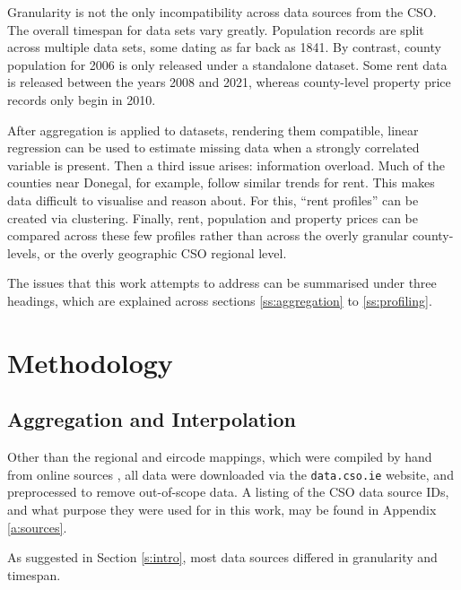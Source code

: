 \documentclass[twocolumn]{article}
\begin{document}
Granularity is not the only incompatibility across data sources from the CSO.
The overall timespan for data sets vary greatly.  Population records are split
across multiple data sets, some dating as far back as 1841.  By contrast,
county population for 2006 is only released under a standalone dataset.  Some
rent data is released between the years 2008 and 2021, whereas county-level
property price records only begin in 2010.

After aggregation is applied to datasets, rendering them compatible, linear
regression can be used to estimate missing data when a strongly correlated
variable is present.  Then a third issue arises: information overload.  Much of
the counties near Donegal, for example, follow similar trends for rent.  This
makes data difficult to visualise and reason about.  For this, ``rent
profiles'' can be created via clustering.  Finally, rent, population and
property prices can be compared across these few profiles rather than across
the overly granular county-levels, or the overly geographic CSO regional
level.

The issues that this work attempts to address can be summarised under three headings,
which are explained across sections \ref{ss:aggregation} to
\ref{ss:profiling}.

\section{Methodology}
\subsection{Aggregation and Interpolation\label{ss:aggregation}}
Other than the regional and eircode mappings, which were compiled by hand from
online sources \cite{eircode19, cso_regions}, all data were downloaded via the
{\tt data.cso.ie} website, and preprocessed to remove out-of-scope data.  A listing of
the CSO data source IDs, and what purpose they were used for in this work, may
be found in Appendix \ref{a:sources}.

As suggested in Section \ref{s:intro}, most data sources differed in granularity
and timespan.
\end{document}
